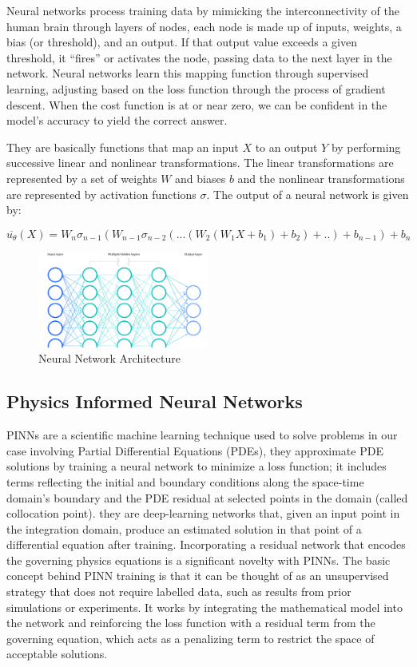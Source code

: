 \documentclass{article}
\begin{document}
Neural networks process training data by mimicking the interconnectivity of the human brain through layers of nodes, each node is made up of inputs, weights, a bias (or threshold), and an output. If that output value exceeds a given threshold, it “fires” or activates the node, passing data to the next layer in the network. Neural networks learn this mapping function through supervised learning,
adjusting based on the loss function through the process of gradient descent. When the cost function is at or near zero, we can be confident in the model’s accuracy to yield the correct answer.

They are basically functions that map an input $X$ to an output $Y$ by performing successive linear and nonlinear transformations. The linear transformations are represented by a set of weights $W$ and biases $b$ and the nonlinear transformations are represented by activation functions $\sigma$. The output of a neural network is given by:

$$\overline{u_\theta}(X)=W_n\sigma_{n-1}(W_{n-1}\sigma_{n-2}(...(W_2(W_1X+b_1)+b_2)+..)+b_{n-1})+b_n$$

\begin{figure}[H]
    \centering
    \includegraphics[width=0.5\textwidth]{images/neural_network.png}
    \caption{Neural Network Architecture}
\end{figure}
\subsection{Physics Informed Neural Networks}

PINNs are a scientific machine learning technique used to solve problems in our case involving Partial Differential Equations (PDEs), they approximate PDE solutions by training a neural network to minimize a loss function; it includes terms reflecting the initial and boundary conditions along the space-time domain’s boundary and the PDE residual at selected points in the domain (called collocation point). 
they are deep-learning networks that, given an input point in the integration domain, produce an estimated solution in that point of a differential equation after training. Incorporating a residual network that encodes the governing physics equations is a significant novelty with PINNs. 
The basic concept behind PINN training is that it can be thought of as an unsupervised strategy that does not require labelled data, such as results from prior simulations or experiments.
It works by integrating the mathematical model into the network and reinforcing the loss function with a residual term from the governing equation, which acts as a penalizing term to restrict the space of acceptable solutions.
\end{document}
